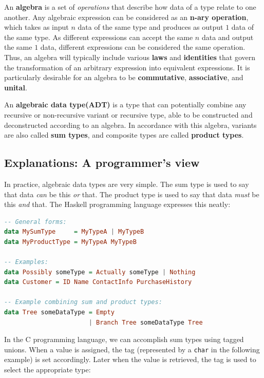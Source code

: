 \documentclass[12pt,a4paper]{article}
\begin{document}
		An \textbf{algebra} is a set of \textit{operations} that describe how data of a type relate to one another. Any algebraic expression can be considered as an \textbf{n-ary operation}, which takes as input $n$ data of the same type and produces as output $1$ data of the same type. As different expressions can accept the same $n$ data and output the same $1$ data, different expressions can be considered the same operation. Thus, an algebra will typically include various \textbf{laws} and \textbf{identities} that govern the transformation of an arbitrary expression into equivalent expressions. It is particularly desirable for an algebra to be \textbf{commutative}, \textbf{associative}, and \textbf{unital}.
		
		An \textbf{algebraic data type(ADT)} is a type that can potentially combine any recursive or non-recursive variant or recursive type, able to be constructed and deconstructed according to an algebra. In accordance with this algebra, variants are also called \textbf{sum types}, and composite types are called \textbf{product types}.
		
		\subsection{Explanations: A programmer's view}
		
		In practice, algebraic data types are very simple. The sum type is used to say that data \textit{can} be this \textit{or} that. The product type is used to say that data \textit{must} be this \textit{and} that. The Haskell programming language expresses this neatly:
		
		\begin{lstlisting}[language=Haskell]
-- General forms:
data MySumType     = MyTypeA | MyTypeB
data MyProductType = MyTypeA MyTypeB

-- Examples:
data Possibly someType = Actually someType | Nothing
data Customer = ID Name ContactInfo PurchaseHistory

-- Example combining sum and product types:
data Tree someDataType = Empty
                       | Branch Tree someDataType Tree
		\end{lstlisting}
		
		In the C programming language, we can accomplish sum types using tagged unions. When a value is assigned, the tag (represented by a \texttt{char} in the following example) is set accordingly. Later when the value is retrieved, the tag is used to select the appropriate type:
		
\end{document}
